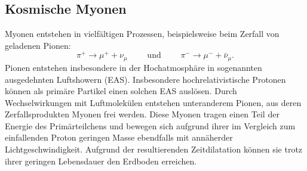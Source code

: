   \subsection{Kosmische Myonen}
  Myonen entstehen in vielfältigen Prozessen, beispielsweise beim Zerfall von geladenen
  Pionen:
  \begin{equation*}
    \pi^+ \to \mu^+ + \nu_{\mu} \qquad \text{ und } \qquad \pi^- \to \mu^- + \bar{\nu}_{\mu} .
  \end{equation*}
  Pionen entstehen insbesondere in der Hochatmosphäre in sogenannten ausgedehnten
  Luftshowern (EAS). Insbesondere hochrelativistische Protonen können als primäre
  Partikel einen solchen EAS auslösen. Durch Wechselwirkungen mit Luftmolekülen
  entstehen unteranderem Pionen, aus deren Zerfallsprodukten Myonen frei werden.
  Diese Myonen tragen einen Teil der Energie des Primärteilchens und bewegen sich
  aufgrund ihrer im Vergleich zum einfallenden Proton geringen Masse ebendfalls mit
  annäherder Lichtgeschwindigkeit. Aufgrund der resultierenden Zeitdilatation
  können sie trotz ihrer geringen Lebensdauer den Erdboden erreichen.
